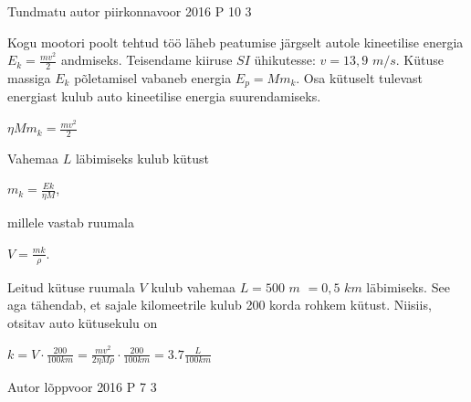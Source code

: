 \documentclass[11pt]{article}
\begin{document}
{%
{Tundmatu autor} %
{piirkonnavoor} %
{2016} %
{P 10} %
{3} %
{

\ifSolution
Kogu mootori poolt tehtud töö läheb peatumise järgselt autole kineetilise energia $E_k = \frac{mv^2}{2}$ andmiseks. Teisendame kiiruse $SI$ ühikutesse: $v = 13,9$ $m/s$. Kütuse massiga $E_k$ põletamisel vabaneb energia $E_p = M m_k$. Osa kütuselt tulevast energiast kulub auto kineetilise energia suurendamiseks.
\begin{center}
$\eta M m_k = \frac{mv^2}{2}$
\end{center}
Vahemaa $L$ läbimiseks kulub kütust 
\begin{center}
$m_k = \frac{Ek}{\eta M}$, 
\end{center}
millele vastab ruumala 
\begin{center}
$V =\frac{mk}{\rho}$.
\end{center}
Leitud kütuse ruumala $V$ kulub vahemaa $L = 500$ $m$ $= 0,5$ $km$ läbimiseks. See aga tähendab, et sajale kilomeetrile kulub 200 korda rohkem kütust. Niisiis, otsitav auto kütusekulu on
\begin{center}
$k = V \cdot \frac{200}{100km} = \frac{mv^2}{2 \eta M \rho} \cdot \frac{200}{100km} = 3.7 \frac{L}{100km}$
\end{center}
\fi
}

{Autor} %
{lõppvoor} %
{2016} %
{P 7} %
{3} %
{

}}
\end{document}
